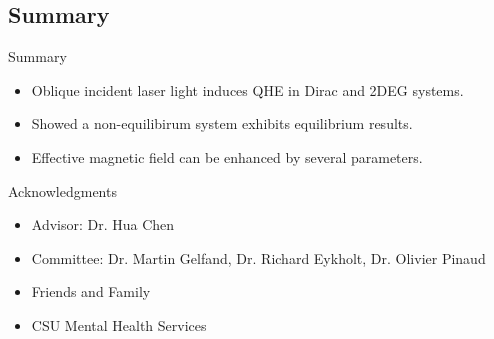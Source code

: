 \documentclass[xcolor=dvipsnames,10pt,aspectratio=169]{beamer}
\newcommand{\CO}{Summary}
\begin{document}
  \subsection{\CO}

  \begin{frame}{\CO}
    \begin{itemize}
      \item Oblique incident laser light induces QHE in Dirac and 2DEG systems.
      \item Showed a non-equilibirum system exhibits equilibrium  results.
      \item Effective magnetic field can be enhanced by several parameters.
    \end{itemize}
  \end{frame}


  \centering
  \begin{frame}{Acknowledgments}
    \vspace{2em}
    \begin{itemize}
      \item Advisor: Dr. Hua Chen
      \item Committee: Dr. Martin Gelfand, Dr. Richard Eykholt, Dr. Olivier Pinaud
      \item Friends and Family
      \item CSU Mental Health Services
    \end{itemize}
  \end{frame}

  \appendix
\end{document}
